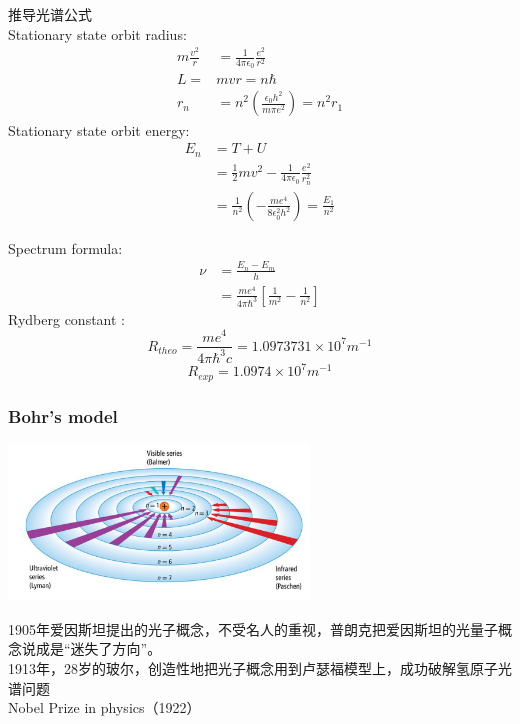 \begin{frame}   
    \frametitle{}
    推导光谱公式\\
    \bullet Stationary state orbit radius:
    \begin{equation*}
        \begin{split}
            m\frac{v^2}{r}&=\frac{1}{4\pi\epsilon_0} \frac{e^2}{r^2} \\
            L=&mvr =n\hbar \\
            r_n&= n^2 (\frac{\epsilon_0 h^2}{m\pi e^2}) =n^2 r_1   
        \end{split} 
     \end{equation*}
     \bullet Stationary state orbit energy: 
     \begin{equation*}
        \begin{split}
            E_n &= T + U \\
            &= \frac{1}{2}mv^2- \frac{1}{4\pi\epsilon_0} \frac{e^2}{r_n ^2} \\
            &= \frac{1}{n^2} (-\frac{m e^4}{8 \epsilon_0 ^2 h^2}) = \frac{E_1}{n^2}
        \end{split}  
     \end{equation*}
\end{frame}

\begin{frame}
    \bullet Spectrum formula: 
    \begin{equation*}
        \begin{split}
         \nu&=\frac{E_n -E_m}{h} \\
         &= \frac{m e^4}{4\pi \hbar ^3} [\frac{1}{m^2} -\frac{1}{n^2}]
        \end{split}  
     \end{equation*}
     \bullet Rydberg constant : 
     \[R_{theo}= \frac{m e^4}{4\pi \hbar ^3 c} =1.0973731\times 10^7 m^{-1}\]
    \[R_{exp}=1.0974\times10^7 m^{-1} \]  
\end{frame}

\begin{frame}   
    \frametitle{Bohr's model}  
    \begin{center}
        \includegraphics[width=0.6\textwidth]{figs/bohratom.png}
    \end{center}  
    \bullet 1905年爱因斯坦提出的光子概念，不受名人的重视，普朗克把爱因斯坦的光量子概念说成是“迷失了方向”。\\
    \bullet 1913年，28岁的玻尔，创造性地把光子概念用到卢瑟福模型上，成功破解氢原子光谱问题 \\
    {\color{deepred} \bullet Nobel Prize in physics（1922）}\\ 
\end{frame}


